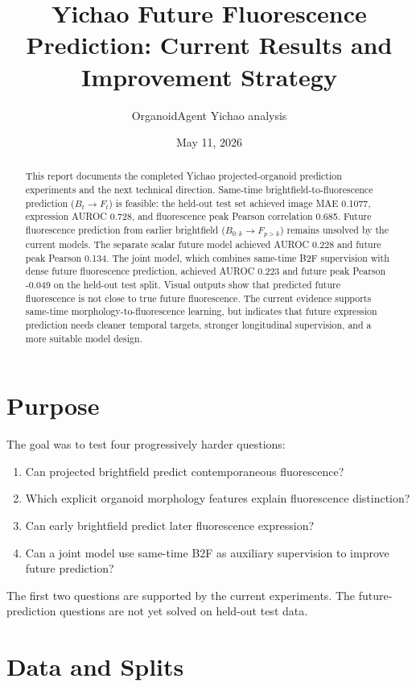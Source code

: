 \documentclass[11pt]{article}
\title{\textbf{Yichao Future Fluorescence Prediction: Current Results and Improvement Strategy}}
\author{OrganoidAgent Yichao analysis}
\date{May 11, 2026}
\begin{document}
\maketitle

\begin{abstract}
This report documents the completed Yichao projected-organoid prediction experiments and the next technical direction. Same-time brightfield-to-fluorescence prediction ($B_t \rightarrow F_t$) is feasible: the held-out test set achieved image MAE 0.1077, expression AUROC 0.728, and fluorescence peak Pearson correlation 0.685. Future fluorescence prediction from earlier brightfield ($B_{0:k} \rightarrow F_{p>k}$) remains unsolved by the current models. The separate scalar future model achieved AUROC 0.228 and future peak Pearson 0.134. The joint model, which combines same-time B2F supervision with dense future fluorescence prediction, achieved AUROC 0.223 and future peak Pearson -0.049 on the held-out test split. Visual outputs show that predicted future fluorescence is not close to true future fluorescence. The current evidence supports same-time morphology-to-fluorescence learning, but indicates that future expression prediction needs cleaner temporal targets, stronger longitudinal supervision, and a more suitable model design.
\end{abstract}

\section{Purpose}

The goal was to test four progressively harder questions:

\begin{enumerate}
\item Can projected brightfield predict contemporaneous fluorescence?
\item Which explicit organoid morphology features explain fluorescence distinction?
\item Can early brightfield predict later fluorescence expression?
\item Can a joint model use same-time B2F as auxiliary supervision to improve future prediction?
\end{enumerate}

The first two questions are supported by the current experiments. The future-prediction questions are not yet solved on held-out test data.

\section{Data and Splits}
\end{document}
